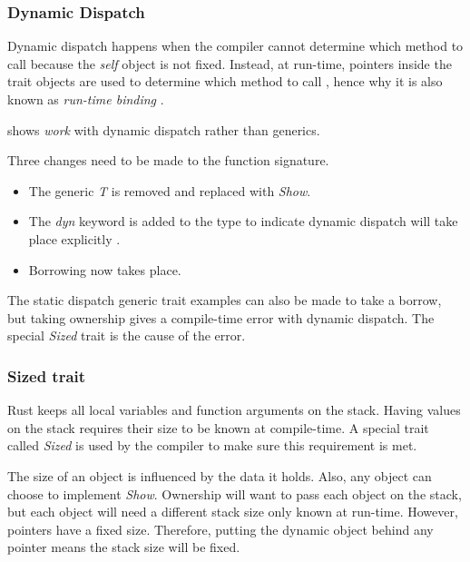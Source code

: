 \subsubsection{Dynamic Dispatch}
Dynamic dispatch \cite{alexandrescu_01_01, klabnik_2019_01} happens when the compiler cannot determine which method to call because the \textit{self} object is not fixed.
Instead, at run-time, pointers inside the trait objects are used to determine which method to call \cite{klabnik_2019_01}, hence why it is also known as \textit{run-time binding} \cite{malik_09_01}.

 shows \textit{work} with dynamic dispatch rather than generics.


Three changes need to be made to the function signature.
\begin{itemize}
	\item The generic \textit{T} is removed and replaced with \textit{Show}.
	\item The \textit{dyn} keyword is added to the type to indicate dynamic dispatch will take place explicitly \cite{klabnik_2019_01}.
	\item Borrowing now takes place.
\end{itemize}

The static dispatch generic trait examples can also be made to take a borrow, but taking ownership gives a compile-time error with dynamic dispatch.
The special \textit{Sized} trait is the cause of the error.

\subsubsection{Sized trait}
Rust keeps all local variables and function arguments on the stack.
Having values on the stack requires their size to be known at compile-time.
A special trait called \textit{Sized} is used by the compiler to make sure this requirement is met. \cite{klabnik_2019_01}

The size of an object is influenced by the data it holds.
Also, any object can choose to implement \textit{Show}.
Ownership will want to pass each object on the stack, but each object will need a different stack size only known at run-time.
However, pointers have a fixed size.
Therefore, putting the dynamic object behind any pointer means the stack size will be fixed.

